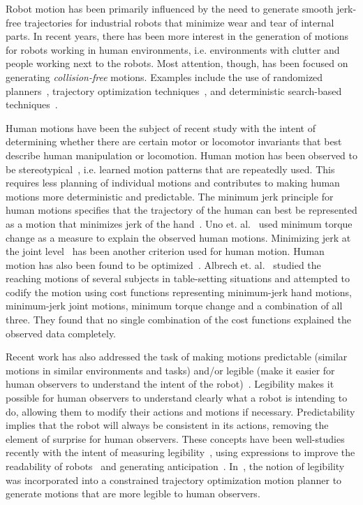 \documentclass[letterpaper, 10 pt, conference]{ieeeconf}  %
\begin{document}
Robot motion has been primarily influenced by the need to generate smooth jerk-free trajectories for industrial robots that minimize wear and tear of internal parts. In recent years, there has been more interest in the generation of motions for robots working in human environments, i.e. environments with clutter and people working next to the robots. Most attention, though, has been focused on generating {\em collision-free} motions. Examples include the use of randomized planners~\cite{kuffner2000rrt}, trajectory optimization techniques~\cite{Mrinal:2011}, and deterministic search-based techniques~\cite{cohen2010search}. 

Human motions have been the subject of recent study with the intent of determining whether there are certain motor or locomotor invariants that best describe human manipulation or locomotion. Human motion has been observed to be stereotypical~\cite{Atkeson:85}, i.e. learned motion patterns that are repeatedly used. This requires less planning of individual motions and contributes to making human motions more deterministic and predictable. The minimum jerk principle for human motions specifies that the trajectory of the human can best be represented as a motion that minimizes jerk of the hand~\cite{Flash:85}. Uno et. al.~\cite{Uno:89} used minimum torque change as a measure to explain the observed human motions. Minimizing jerk at the joint level~\cite{Rosenbaum:1995} has been another criterion used for human motion. Human motion has also been found to be optimized~\cite{Arechavaleta:2006}. Albrech et. al.~\cite{Albrecht:2011} studied the reaching motions of several subjects in table-setting situations and attempted to codify the motion using cost functions representing minimum-jerk hand motions, minimum-jerk joint motions, minimum torque change and a combination of all three. They found that no single combination of the cost functions explained the observed data completely. 

Recent work has also addressed the task of making motions predictable (similar motions in similar environments and tasks) and/or legible (make it easier for human observers to understand the intent of the robot)~\cite{Beetz:2010}. Legibility makes it possible for human observers to understand clearly what a robot is intending to do, allowing them to modify their actions and motions if necessary. Predictability implies that the robot will always be consistent in its actions, removing the element of surprise for human observers. These concepts have been well-studies recently with the intent of measuring legibility~\cite{Lichtenthaler:2011}, using expressions to improve the readability of robots~\cite{Takayama:2011} and generating anticipation~\cite{Gielniak:2011}. In~\cite{Dragan:2013}, the notion of legibility was incorporated into a constrained trajectory optimization motion planner to generate motions that are more legible to human observers. 
\end{document}
